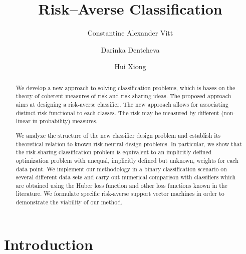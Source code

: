 \documentclass[10pt,letterpaper]{article}
\newcommand{\1}{1{\hskip -2.55 pt}\hbox{I}}
\begin{document}
\title{Risk--Averse Classification}
\author[1]{Constantine Alexander Vitt}
\author[2]{Darinka Dentcheva}
\author[1]{Hui Xiong}

\maketitle




\begin{abstract}
We develop a new approach to solving classification problems, which
is bases on the theory of coherent measures of risk and risk sharing ideas. The proposed approach aims at designing a risk-averse classifier. The new approach allows for associating distinct risk functional to each classes. The risk may be measured by different (non-linear in probability) measures,

We analyze the structure of the new classifier design problem and establish its theoretical relation to known risk-neutral design problems. In particular, we show that the risk-sharing classification problem is equivalent to an implicitly defined optimization problem with unequal, implicitly defined but unknown, weights for each data point. We implement our methodology in a binary classification scenario on several different data sets and carry out numerical comparison with classifiers which are obtained using the Huber loss function and other loss functions known in the literature. 
We formulate specific risk-averse support vector machines in order to demonstrate the viability of our method.
\end{abstract}





\section{Introduction} %
\label{sec:introduction}
\end{document}
